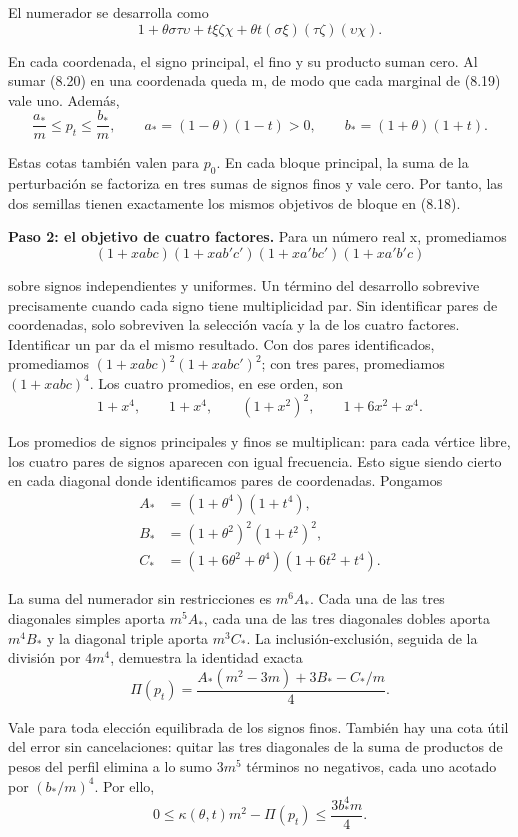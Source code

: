 \documentclass[spanish,11pt,a4paper]{article}
\begin{document}
El numerador se desarrolla como
\[1+\theta\sigma\tau\upsilon+t\xi\zeta\chi
  +\theta t(\sigma\xi)(\tau\zeta)(\upsilon\chi).              \tag{8.20}\]

En cada coordenada, el signo principal, el fino y su producto suman cero. Al sumar (8.20) en una coordenada queda m, de modo que cada marginal de (8.19) vale uno. Además,
\[\frac{a_*}{m}\leq p_t\leq\frac{b_*}{m},\qquad
a_*=(1-\theta)(1-t)>0,\qquad b_*=(1+\theta)(1+t).             \tag{8.21}\]

Estas cotas también valen para \(p_0\). En cada bloque principal, la suma de la perturbación se factoriza en tres sumas de signos finos y vale cero. Por tanto, las dos semillas tienen exactamente los mismos objetivos de bloque en (8.18).

\textbf{Paso 2: el objetivo de cuatro factores.} Para un número real x, promediamos
\[(1+xabc)(1+xab'c')(1+xa'bc')(1+xa'b'c)\]

sobre signos independientes y uniformes. Un término del desarrollo sobrevive precisamente cuando cada signo tiene multiplicidad par. Sin identificar pares de coordenadas, solo sobreviven la selección vacía y la de los cuatro factores. Identificar un par da el mismo resultado. Con dos pares identificados, promediamos \((1+xabc)^2(1+xabc')^2\); con tres pares, promediamos \((1+xabc)^4\). Los cuatro promedios, en ese orden, son
\[1+x^4,\qquad 1+x^4,\qquad (1+x^2)^2,\qquad 1+6x^2+x^4.     \tag{8.22}\]

Los promedios de signos principales y finos se multiplican: para cada vértice libre, los cuatro pares de signos aparecen con igual frecuencia. Esto sigue siendo cierto en cada diagonal donde identificamos pares de coordenadas. Pongamos
\[\begin{aligned}
A_*&=(1+\theta^4)(1+t^4),\\
B_*&=(1+\theta^2)^2(1+t^2)^2,\\
C_*&=(1+6\theta^2+\theta^4)(1+6t^2+t^4).
\end{aligned}\]

La suma del numerador sin restricciones es \(m^6A_*\). Cada una de las tres diagonales simples aporta \(m^5A_*\), cada una de las tres diagonales dobles aporta \(m^4B_*\) y la diagonal triple aporta \(m^3C_*\). La inclusión-exclusión, seguida de la división por \(4m^4\), demuestra la identidad exacta
\[\Pi(p_t)=\frac{A_*(m^2-3m)+3B_*-C_*/m}{4}.                 \tag{8.23}\]

Vale para toda elección equilibrada de los signos finos. También hay una cota útil del error sin cancelaciones: quitar las tres diagonales de la suma de productos de pesos del perfil elimina a lo sumo \(3m^5\) términos no negativos, cada uno acotado por \((b_*/m)^4\). Por ello,
\[0\leq\kappa(\theta,t)m^2-\Pi(p_t)\leq\frac{3b_*^4m}{4}.    \tag{8.24}\]
\end{document}
